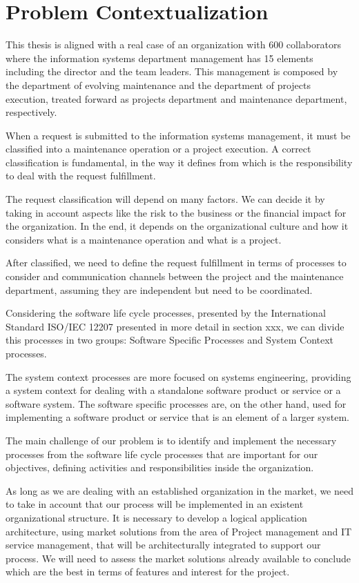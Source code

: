 
% 
% 

\section{Problem Contextualization}

This thesis is aligned with a real case of an organization with 600 collaborators where the information systems department management has 15 elements including the director and the team leaders. This management is composed by the department of evolving maintenance and the department of projects execution, treated forward as projects department and maintenance department, respectively.\par
When a request is submitted to the information systems management, it must be classified into a maintenance operation or a project execution. A correct classification is fundamental, in the way it defines from which is the responsibility to deal with the request fulfillment.\par
The request classification will depend on many factors. We can decide it by taking in account aspects like the risk to the business or the financial impact for the organization. In the end, it depends on the organizational culture and how it considers what is a maintenance operation and what is a project.\par
After classified, we need to define the request fulfillment in terms of processes to consider and communication channels between the project and the maintenance department, assuming they are independent but need to be coordinated.\par
Considering the software life cycle processes, presented by the International Standard ISO/IEC 12207 presented in more detail in section xxx, we can divide this processes in two groups: Software Specific Processes and System Context processes.\par
The system context processes are more focused on systems engineering, providing a system context for dealing with a standalone software product or service or a software system. The software specific processes are, on the other hand, used for implementing a software product or service that is an element of a larger system. \par 
The main challenge of our problem is to identify and implement the necessary processes from the software life cycle processes that are important for our objectives, defining activities and responsibilities inside the organization.\par
As long as we are dealing with an established organization in the market, we need to take in account that our process will be implemented in an existent organizational structure. It is necessary to develop a logical application architecture, using market solutions from the area of Project management and IT service management, that will be architecturally integrated to support our process. We will need to assess the market solutions already available to conclude which are the best in terms of features and interest for the project. 
